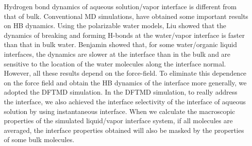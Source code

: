 Hydrogen bond dynamics of aqueous solution/vapor interface is different from that of bulk. 
Conventional MD simulations, have obtained some important results on HB dynamics.
Using the polarizable water models, Liu \etal\cite{LiuPu2005} showed that
the dynamics of breaking and forming H-bonds at the water/vapor interface is faster than that in bulk water. 
Benjamin\cite{Benjamin2005} showed that, for some water/organic liquid interfaces, the dynamics are slower at the interface 
than in the bulk and are sensitive to the location of the water molecules along the interface normal.
However, all these results depend on the force-field. 
To eliminate this dependence on the force field and obtain the HB dynamics of the interface more generally, 
we adopted the DFTMD simulation.
%
In the DFTMD simulation, to really address the interface, we also achieved the interface selectivity of the interface of aqueous solution by using instantaneous interface. 
When we calculate the macroscopic properties of the simulated liquid/vapor interface system, 
if all molecules are averaged, the interface properties obtained will also be masked by the properties of some bulk molecules. 
